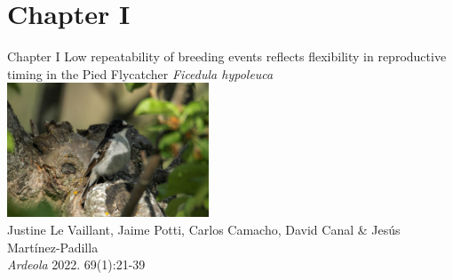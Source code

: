 \documentclass[compress]{beamer}
\begin{document}
\section{Chapter I}
\begin{frame}{Chapter I}
\centering
\large{Low repeatability of breeding events reflects
flexibility in reproductive timing in the Pied
Flycatcher \textit{Ficedula hypoleuca}} \\
\vfill
\includegraphics[height = 4cm]{Photos/Mating.jpg} \\
\normalsize
Justine Le Vaillant, Jaime Potti, Carlos Camacho, David Canal \& Jes\'{u}s Mart\'{i}nez-Padilla \\
\vfill \small{\textit{Ardeola} 2022. 69(1):21-39}

\end{frame}
\end{document}
